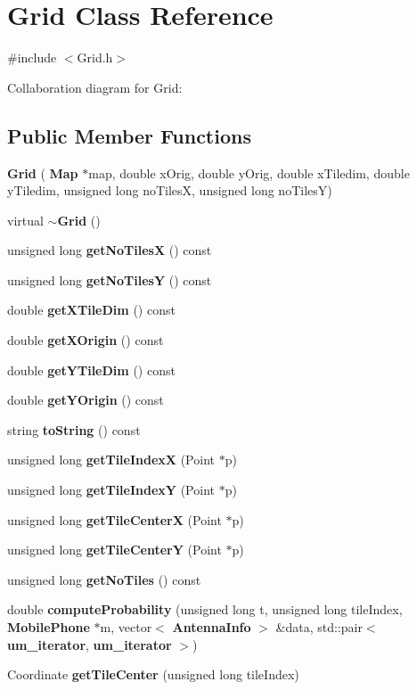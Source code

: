 \section{Grid Class Reference}
\label{class_grid}


{\ttfamily \#include $<$Grid.\+h$>$}



Collaboration diagram for Grid\+:
\subsection*{Public Member Functions}
\begin{DoxyCompactItemize}
\item 
\textbf{ Grid} (\textbf{ Map} $\ast$map, double x\+Orig, double y\+Orig, double x\+Tiledim, double y\+Tiledim, unsigned long no\+TilesX, unsigned long no\+TilesY)
\item 
virtual \textbf{ $\sim$\+Grid} ()
\item 
unsigned long \textbf{ get\+No\+TilesX} () const
\item 
unsigned long \textbf{ get\+No\+TilesY} () const
\item 
double \textbf{ get\+X\+Tile\+Dim} () const
\item 
double \textbf{ get\+X\+Origin} () const
\item 
double \textbf{ get\+Y\+Tile\+Dim} () const
\item 
double \textbf{ get\+Y\+Origin} () const
\item 
string \textbf{ to\+String} () const
\item 
unsigned long \textbf{ get\+Tile\+IndexX} (Point $\ast$p)
\item 
unsigned long \textbf{ get\+Tile\+IndexY} (Point $\ast$p)
\item 
unsigned long \textbf{ get\+Tile\+CenterX} (Point $\ast$p)
\item 
unsigned long \textbf{ get\+Tile\+CenterY} (Point $\ast$p)
\item 
unsigned long \textbf{ get\+No\+Tiles} () const
\item 
double \textbf{ compute\+Probability} (unsigned long t, unsigned long tile\+Index, \textbf{ Mobile\+Phone} $\ast$m, vector$<$ \textbf{ Antenna\+Info} $>$ \&data, std\+::pair$<$ \textbf{ um\+\_\+iterator}, \textbf{ um\+\_\+iterator} $>$)
\item 
Coordinate \textbf{ get\+Tile\+Center} (unsigned long tile\+Index)
\end{DoxyCompactItemize}
